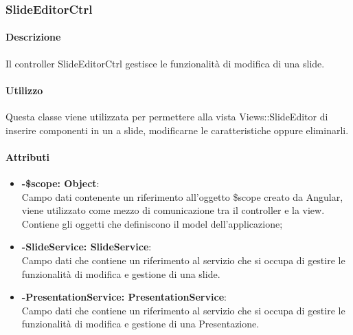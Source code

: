 %		  
%	
\newpage
	
\subsubsection{SlideEditorCtrl}
	\paragraph{Descrizione}
	Il controller SlideEditorCtrl gestisce le funzionalità di modifica di una slide.
	
	\paragraph{Utilizzo}
	Questa classe viene utilizzata per permettere alla vista Views::SlideEditor di inserire componenti in un a slide, modificarne le caratteristiche oppure eliminarli.\\
	\paragraph{Attributi}
	\begin{itemize}
		\item \textbf{-\$scope: Object}:\\
			Campo dati contenente un riferimento all'oggetto \$scope creato da Angular, viene utilizzato come mezzo di comunicazione tra il controller e la view. Contiene gli oggetti che definiscono il model dell'applicazione;
		\item \textbf{-SlideService: SlideService}:\\
			Campo dati che contiene un riferimento al servizio che si occupa di gestire le funzionalità di modifica e gestione di una slide.
		\item \textbf{-PresentationService: PresentationService}:\\
			Campo dati che contiene un riferimento al servizio che si occupa di gestire le funzionalità di modifica e gestione di una Presentazione.
	\end{itemize}
	
